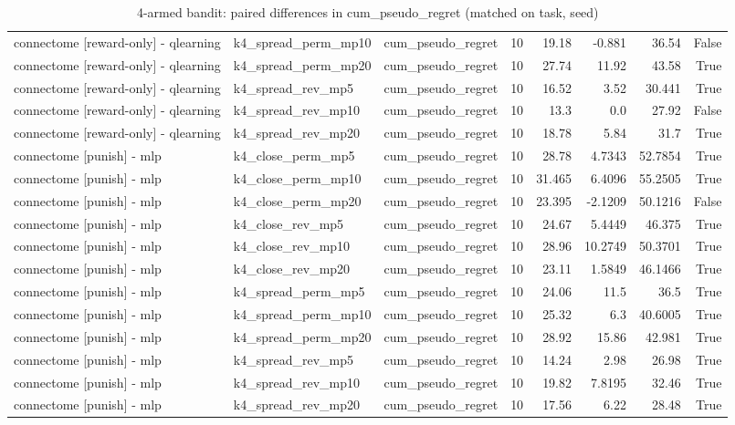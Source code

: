 \begin{table}[t]
\begin{tabular}{lllrrrrr}
connectome [reward-only] - qlearning & k4\_spread\_perm\_mp10 & cum\_pseudo\_regret & 10 & 19.18 & -0.881 & 36.54 & False \\
connectome [reward-only] - qlearning & k4\_spread\_perm\_mp20 & cum\_pseudo\_regret & 10 & 27.74 & 11.92 & 43.58 & True \\
connectome [reward-only] - qlearning & k4\_spread\_rev\_mp5 & cum\_pseudo\_regret & 10 & 16.52 & 3.52 & 30.441 & True \\
connectome [reward-only] - qlearning & k4\_spread\_rev\_mp10 & cum\_pseudo\_regret & 10 & 13.3 & 0.0 & 27.92 & False \\
connectome [reward-only] - qlearning & k4\_spread\_rev\_mp20 & cum\_pseudo\_regret & 10 & 18.78 & 5.84 & 31.7 & True \\
connectome [punish] - mlp & k4\_close\_perm\_mp5 & cum\_pseudo\_regret & 10 & 28.78 & 4.7343 & 52.7854 & True \\
connectome [punish] - mlp & k4\_close\_perm\_mp10 & cum\_pseudo\_regret & 10 & 31.465 & 6.4096 & 55.2505 & True \\
connectome [punish] - mlp & k4\_close\_perm\_mp20 & cum\_pseudo\_regret & 10 & 23.395 & -2.1209 & 50.1216 & False \\
connectome [punish] - mlp & k4\_close\_rev\_mp5 & cum\_pseudo\_regret & 10 & 24.67 & 5.4449 & 46.375 & True \\
connectome [punish] - mlp & k4\_close\_rev\_mp10 & cum\_pseudo\_regret & 10 & 28.96 & 10.2749 & 50.3701 & True \\
connectome [punish] - mlp & k4\_close\_rev\_mp20 & cum\_pseudo\_regret & 10 & 23.11 & 1.5849 & 46.1466 & True \\
connectome [punish] - mlp & k4\_spread\_perm\_mp5 & cum\_pseudo\_regret & 10 & 24.06 & 11.5 & 36.5 & True \\
connectome [punish] - mlp & k4\_spread\_perm\_mp10 & cum\_pseudo\_regret & 10 & 25.32 & 6.3 & 40.6005 & True \\
connectome [punish] - mlp & k4\_spread\_perm\_mp20 & cum\_pseudo\_regret & 10 & 28.92 & 15.86 & 42.981 & True \\
connectome [punish] - mlp & k4\_spread\_rev\_mp5 & cum\_pseudo\_regret & 10 & 14.24 & 2.98 & 26.98 & True \\
connectome [punish] - mlp & k4\_spread\_rev\_mp10 & cum\_pseudo\_regret & 10 & 19.82 & 7.8195 & 32.46 & True \\
connectome [punish] - mlp & k4\_spread\_rev\_mp20 & cum\_pseudo\_regret & 10 & 17.56 & 6.22 & 28.48 & True \\
\bottomrule
\end{tabular}
\caption{4-armed bandit: paired differences in cum\_pseudo\_regret (matched on task, seed)}
\label{tab:bandit_punish_paired_cum_pseudo_regret}
\end{table}
